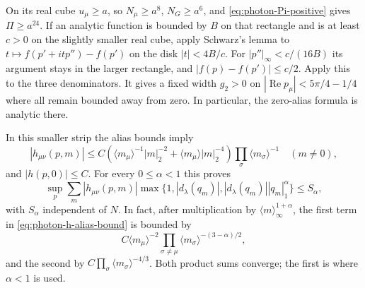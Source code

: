\documentclass[11pt,letterpaper,reqno]{amsart}
\begin{document}
On its real cube $u_\mu\ge a$, so
$N_\mu\ge a^8$, $N_G\ge a^6$, and
\eqref{eq:photon-Pi-positive} gives $\Pi\ge a^{24}$.
If an analytic function is bounded by $B$ on that rectangle and is
at least $c>0$ on the slightly smaller real cube, apply Schwarz's
lemma to $t\mapsto f(p'+itp'')-f(p')$ on the disk
$|t|<4B/c$. For $|p''|_\infty<c/(16B)$ its argument stays in the
larger rectangle, and $|f(p)-f(p')|\le c/2$.
Apply this to the three denominators. It gives a fixed width $g_2>0$
on $|\operatorname{Re}p_\mu|<5\pi/4-1/4$ where all remain
bounded away from zero. In particular, the zero-alias formula is
analytic there.

In this smaller strip the alias bounds imply
\begin{equation}\label{eq:photon-h-alias-bound}
 |h_{\mu\nu}(p,m)|\le C\left(
       \langle m_\mu\rangle^{-1}|m|_2^{-2}
          +\langle m_\mu\rangle|m|_2^{-4}\right)
                     \prod_\sigma\langle m_\sigma\rangle^{-1}
                 \quad(m\ne0),
\end{equation}
and $|h(p,0)|\le C$. For every $0\le\alpha<1$ this proves
\begin{equation}\label{eq:photon-alias-Holder-sum}
 \sup_p\sum_m|h_{\mu\nu}(p,m)|
       \max\{1,|d_\lambda(q_m)|,
                      |d_\lambda(q_m)||q_m|_1^\alpha\}\le S_\alpha,
\end{equation}
with $S_\alpha$ independent of $N$. In fact, after multiplication
by $\langle m\rangle_\infty^{1+\alpha}$, the first term in
\eqref{eq:photon-h-alias-bound} is bounded by
\[
 C\langle m_\mu\rangle^{-2}
            \prod_{\sigma\ne\mu}\langle m_\sigma\rangle^{-(3-\alpha)/2},
\]
and the second by $C\prod_\sigma\langle m_\sigma\rangle^{-4/3}$.
Both product sums converge; the first is where $\alpha<1$ is used.
\end{document}

